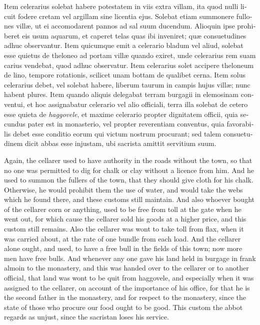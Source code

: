 \documentclass{book}
\begin{document}
\begin{paracol}{2}
\switchcolumn*

\begin{otherlanguage}{latin}
Item celerarius solebat habere potestatem in viis extra villam, ita quod nulli licuit fodere cretam vel argillam sine licentia ejus. Solebat etiam summonere fullones vill\ae{}, ut ei accomodarent pannos ad sal suum ducendum. Alioquin ipse prohiberet eis usum aquarum, et caperet telas quas  ibi inveniret; qu\ae{} consuetudines adhuc observantur. Item quicumque emit a celerario bladum vel aliud,  solebat esse quietus de theloneo ad portam vill\ae{} quando exiret, unde celerarius rem suam carius vendebat, quod adhuc observatur. Item celerarius solet accipere theloneum de lino, tempore rotationis, scilicet unam bottam de qualibet cerna. Item solus celerarius debet, vel solebat habere, liberum taurum in campis hujus vill\ae{}; nunc habent plures. Item quando aliquis delegabat terram burgagii in elemosinam conventui, et hoc assignabatur celerario vel alio officiali, terra illa solebat de cetero esse quieta de \emph{haggovele}, et maxime celerario propter dignitatem officii, quia secundus pater est in monasterio, vel propter reverentiam conventus, quia favorabilis debet esse conditio eorum qui victum nostrum procurant; sed talem consuetudinem dicit abbas esse injustam, ubi sacrista amittit servitium suum. 
\end{otherlanguage}

\switchcolumn

Again, the cellarer used to have authority in the roads without the town, so that no one was permitted to dig for chalk or clay without a licence from him. And he used to summon the fullers of the town, that they should give cloth for his chalk. Otherwise, he would prohibit them the use of water, and would take the webs which he found there, and these customs still maintain. And also whoever bought of the cellarer corn or anything, used to be free from toll at the gate when he went out, for which cause the cellarer sold his goods at a higher price, and this custom still remains. Also the cellarer was wont to take toll from flax, when it was carried about, at the rate of one bundle from each load. And the cellarer alone ought, and used, to have a free bull in the fields of this town; now more men have free bulls. And whenever any one gave his land held in burgage in frank almoin to the monastery, and this was handed over to the cellarer or to another official, that land was wont to be quit from haggovele, and especially when it was assigned to the cellarer, on account of the importance of his office, for that he is the second father in the monastery, and for respect to the monastery, since the state of those who procure our food ought to be good. This custom the abbot regards as unjust, since the sacristan loses his service.


\end{paracol}
\end{document}
